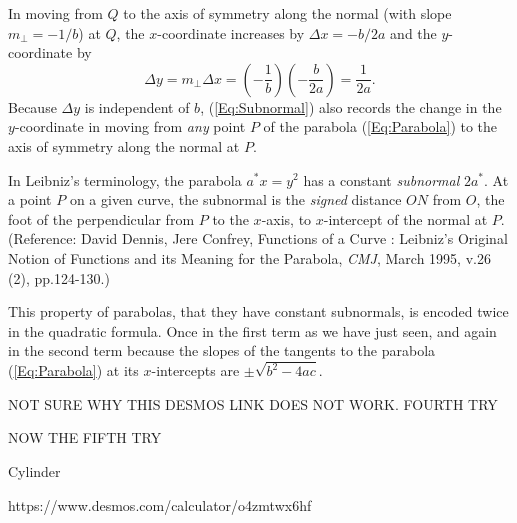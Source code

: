 \documentclass{ximera}
\begin{document}

In moving from $Q$ to the axis of symmetry along the normal (with slope $m_\perp = -1/b$) at $Q$, the $x$-coordinate increases by $\Delta x = -b/2a$ and the $y$-coordinate by
\begin{equation}
 \Delta y = m_\perp \Delta x = \left( -\frac{1}{b}\right) \left(- \frac{b}{2a}  \right)= \frac{1}{2a} .  \label{Eq:Subnormal}
\end{equation}
Because $\Delta y$ is independent of $b$, (\ref{Eq:Subnormal}) also records the change in the $y$-coordinate in moving from \emph{any} point $P$ of the parabola (\ref{Eq:Parabola}) to the axis of symmetry along the normal at $P$.

In Leibniz's terminology, the parabola $a^* x=y^2$ has a constant \emph{subnormal} $2a^*$. At a point $P$ on a given curve, the subnormal is the \emph{signed} distance $ON$ from $O$, the foot of the perpendicular from $P$ to the $x$-axis, to $x$-intercept of the normal at $P$. %
(Reference: David Dennis, Jere Confrey, Functions of a Curve :
Leibniz's Original Notion of Functions and its Meaning for the Parabola, \emph{CMJ}, March 1995, v.26 (2), pp.124-130.) 

This property of parabolas, that they have constant subnormals, is encoded twice in the quadratic formula. Once in the first term as we have just seen, and again in the second term because the slopes of the tangents to the parabola (\ref{Eq:Parabola}) at its $x$-intercepts are $\pm \sqrt{b^2-4ac}$. 

NOT SURE WHY THIS DESMOS LINK DOES NOT WORK. FOURTH TRY

NOW THE FIFTH TRY

\begin{exploration}\label{exp:orth1}
Cylinder
\begin{center}
\end{center}
\end{exploration}


https://www.desmos.com/calculator/o4zmtwx6hf
\end{document}

